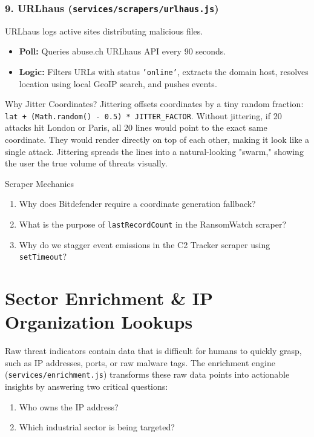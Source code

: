 \documentclass[11pt,a4paper]{report}
\begin{document}
\subsection{9. URLhaus (\texttt{services/scrapers/urlhaus.js})}
URLhaus logs active sites distributing malicious files.
\begin{itemize}
  \item \textbf{Poll:} Queries abuse.ch URLhaus API every 90 seconds.
  \item \textbf{Logic:} Filters URLs with status \texttt{'online'}, extracts the domain host, resolves location using local GeoIP search, and pushes events.
\end{itemize}

\begin{memoryanchor}{Why Jitter Coordinates?}
  Jittering offsets coordinates by a tiny random fraction: \texttt{lat + (Math.random() - 0.5) * JITTER\_FACTOR}. Without jittering, if 20 attacks hit London or Paris, all 20 lines would point to the exact same coordinate. They would render directly on top of each other, making it look like a single attack. Jittering spreads the lines into a natural-looking "swarm," showing the user the true volume of threats visually.
\end{memoryanchor}

\begin{activerecall}{Scraper Mechanics}
  \begin{enumerate}
    \item Why does Bitdefender require a coordinate generation fallback?
    \item What is the purpose of \texttt{lastRecordCount} in the RansomWatch scraper?
    \item Why do we stagger event emissions in the C2 Tracker scraper using \texttt{setTimeout}?
  \end{enumerate}
\end{activerecall}

\newpage

\chapter{Sector Enrichment \& IP Organization Lookups}

Raw threat indicators contain data that is difficult for humans to quickly grasp, such as IP addresses, ports, or raw malware tags. The enrichment engine (\texttt{services/enrichment.js}) transforms these raw data points into actionable insights by answering two critical questions:
\begin{enumerate}
  \item Who owns the IP address?
  \item Which industrial sector is being targeted?
\end{enumerate}
\end{document}
